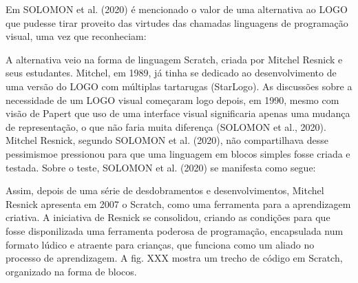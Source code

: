 \documentclass[
12pt,		%
openright,	%
twoside,  %
a4paper,			%
chapter=TITLE,		%
english,			%
french,				%
spanish,			%
brazil				%
]{USPSC-classe/USPSC}
\begin{document}
Em SOLOMON et al. (2020) \'e mencionado o valor de uma alternativa ao LOGO que pudesse tirar proveito das virtudes das chamadas \textquotedbl linguagens de programa\c{c}\~ao visual\textquotedbl , uma vez que reconheciam:





\noindent\begin{center}\mbox{\centering{}}\end{center}


A alternativa veio na forma de linguagem Scratch, criada por Mitchel Resnick e seus estudantes. Mitchel, em 1989, j\'a tinha se dedicado ao desenvolvimento de uma vers\~ao do LOGO com m\'ultiplas tartarugas (StarLogo). As discuss\~oes sobre a necessidade de um LOGO visual come\c{c}aram logo depois, em 1990, mesmo com vis\~ao de Papert que uso de uma interface visual significaria apenas uma mudan\c{c}a de representa\c{c}\~ao, o que n\~ao faria muita diferen\c{c}a   (SOLOMON et al., 2020). Mitchel Resnick, segundo  SOLOMON et al. (2020), \textquotedbl n\~ao compartilhava desse pessimismo\textquotedbl  e pressionou para que uma linguagem em blocos simples fosse criada e testada. Sobre o teste,  SOLOMON et al. (2020) se manifesta como segue:





\noindent\begin{center}\mbox{\centering{}}\end{center}


Assim, depois de uma s\'erie de desdobramentos e desenvolvimentos, Mitchel Resnick apresenta em 2007 o Scratch, como uma ferramenta para a aprendizagem criativa. A iniciativa de Resnick se consolidou, criando as condi\c{c}\~oes para que fosse disponilizada uma ferramenta poderosa de programa\c{c}\~ao, encapsulada num formato l\'udico e atraente para crian\c{c}as, que funciona como um aliado no processo de aprendizagem. A fig. XXX mostra um trecho de c\'odigo em Scratch, organizado na forma de blocos.
\end{document}
